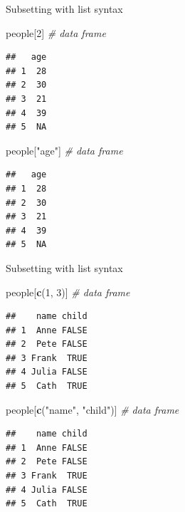 \documentclass[ignorenonframetext,]{beamer}
\newenvironment{Shaded}{\begin{snugshade}}{\end{snugshade}}
\newcommand{\CommentTok}[1]{\textcolor[rgb]{0.56,0.35,0.01}{\textit{#1}}}
\newcommand{\DecValTok}[1]{\textcolor[rgb]{0.00,0.00,0.81}{#1}}
\newcommand{\KeywordTok}[1]{\textcolor[rgb]{0.13,0.29,0.53}{\textbf{#1}}}
\newcommand{\NormalTok}[1]{#1}
\newcommand{\StringTok}[1]{\textcolor[rgb]{0.31,0.60,0.02}{#1}}
\begin{document}
\begin{frame}[fragile]{Subsetting with list syntax}
\protect\hypertarget{subsetting-with-list-syntax}{}

\begin{Shaded}
\begin{Highlighting}[]
\NormalTok{people[}\DecValTok{2}\NormalTok{] }\CommentTok{# data frame}
\end{Highlighting}
\end{Shaded}

\begin{verbatim}
##   age
## 1  28
## 2  30
## 3  21
## 4  39
## 5  NA
\end{verbatim}

\begin{Shaded}
\begin{Highlighting}[]
\NormalTok{people[}\StringTok{"age"}\NormalTok{] }\CommentTok{# data frame}
\end{Highlighting}
\end{Shaded}

\begin{verbatim}
##   age
## 1  28
## 2  30
## 3  21
## 4  39
## 5  NA
\end{verbatim}

\end{frame}

\begin{frame}[fragile]{Subsetting with list syntax}
\protect\hypertarget{subsetting-with-list-syntax-1}{}

\begin{Shaded}
\begin{Highlighting}[]
\NormalTok{people[}\KeywordTok{c}\NormalTok{(}\DecValTok{1}\NormalTok{, }\DecValTok{3}\NormalTok{)] }\CommentTok{# data frame}
\end{Highlighting}
\end{Shaded}

\begin{verbatim}
##    name child
## 1  Anne FALSE
## 2  Pete FALSE
## 3 Frank  TRUE
## 4 Julia FALSE
## 5  Cath  TRUE
\end{verbatim}

\begin{Shaded}
\begin{Highlighting}[]
\NormalTok{people[}\KeywordTok{c}\NormalTok{(}\StringTok{"name"}\NormalTok{, }\StringTok{"child"}\NormalTok{)] }\CommentTok{# data frame}
\end{Highlighting}
\end{Shaded}

\begin{verbatim}
##    name child
## 1  Anne FALSE
## 2  Pete FALSE
## 3 Frank  TRUE
## 4 Julia FALSE
## 5  Cath  TRUE
\end{verbatim}

\end{frame}
\end{document}
